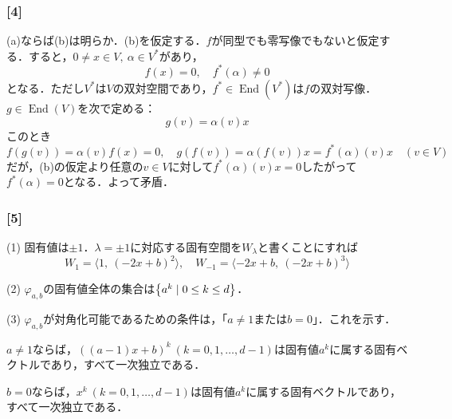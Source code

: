 \documentclass[a4j]{ltjsarticle}
\newcommand{\1}{\mathbbm{1}}
\numberwithin{equation}{section}
\theoremstyle{definition}
\begin{document}
\subsubsection*{[4]}
(a)ならば(b)は明らか．(b)を仮定する．$f$が同型でも零写像でもないと仮定する．すると，$0\neq x\in V,\ \alpha\in V^\ast$があり，
\begin{equation}
    f(x)=0,\quad f^\ast(\alpha)\neq0 
\end{equation}
となる．ただし$V^\ast$は$V$の双対空間であり，$f^\ast\in \mathop{\mathrm{End}}(V^\ast)$は$f$の双対写像．$g\in \mathop{\mathrm{End}}(V)$を次で定める：
\begin{equation}
    g(v)=\alpha(v)x
\end{equation}
このとき
\begin{equation}
    f(g(v))=\alpha(v)f(x)=0,\quad g(f(v))=\alpha(f(v))x=f^\ast(\alpha)(v)x\quad (v\in V)
\end{equation}
だが，(b)の仮定より任意の$v\in V$に対して$f^\ast(\alpha)(v)x=0$したがって$f^\ast(\alpha)=0$となる．よって矛盾．
\subsubsection*{[5]}
(1) 固有値は$\pm 1$．$\lambda=\pm1$に対応する固有空間を$W_{\lambda}$と書くことにすれば
\begin{equation}
    W_{1}=\langle1,\ (-2x+b)^2\rangle ,\quad W_{-1}=\langle-2x+b,\ (-2x+b)^3\rangle
\end{equation}

(2) $\varphi_{a,b}$の固有値全体の集合は$\qty{a^k\mid 0\leq k\leq d}$．

(3) $\varphi_{a,b}$が対角化可能であるための条件は，「$a\neq 1$または$b=0$」．これを示す．

$a\neq 1$ならば，$((a-1)x+b)^k\ (k=0,1,\ldots,d-1)$は固有値$a^k$に属する固有ベクトルであり，すべて一次独立である．

$b=0$ならば，$x^k\ (k=0,1,\ldots,d-1)$は固有値$a^k$に属する固有ベクトルであり，すべて一次独立である．
\end{document}
